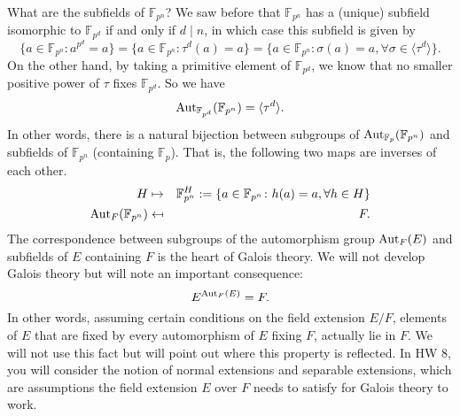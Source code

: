 \documentclass{article}
\def\Aut{{\rm Aut}}
\def\F{{\mathbb F}}
\def\F{{\mathbb F}}
\begin{document}
What are the subfields of $\F_{p^n}$? We saw before that $\F_{p^n}$ has a (unique) subfield isomorphic to $\F_{p^d}$ if and only if $d\mid n$, in which case this subfield is given by $$\{a\in\F_{p^n}\colon a^{p^d} = a\} = \{a\in\F_{p^n}\colon \tau^d(a) = a\} = \{a\in\F_{p^n}\colon \sigma(a) = a,\forall \sigma\in\langle\tau^d\rangle\}.$$
On the other hand, by taking a primitive element of $\F_{p^d}$, we know that no smaller positive power of $\tau$ fixes $\F_{p^d}$. So we have $$\Aut_{\F_{p^d}}(\F_{p^n}) = \langle \tau^d\rangle.$$
In other words, there is a natural bijection between subgroups of $\Aut_{\F_p}(\F_{p^n})$ and subfields of $\F_{p^n}$ (containing $\F_p$). That is, the following two maps are inverses of each other.
\begin{eqnarray*}
    H&\mapsto& \F_{p^n}^H := \{a\in\F_{p^n}\colon h(a) = a,\forall h\in H\}\\
    \Aut_F(\F_{p^n})&\mapsfrom& F.
\end{eqnarray*}
The correspondence between subgroups of the automorphism group $\Aut_F(E)$ and subfields of $E$ containing $F$ is the heart of Galois theory. We will not develop Galois theory but will note an important consequence:
$$E^{\Aut_F(E)} = F.$$
In other words, assuming certain conditions on the field extension $E/F$, elements of $E$ that are fixed by every automorphism of $E$ fixing $F$, actually lie in $F$. We will not use this fact but will point out where this property is reflected. In HW 8, you will consider the notion of normal extensions and separable extensions, which are assumptions the field extension $E$ over $F$ needs to satisfy for Galois theory to work.
\end{document}
